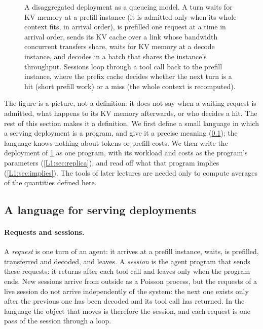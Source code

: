 \begin{figure}[t]
\caption{A disaggregated deployment as a queueing model. A turn waits for KV memory
at a prefill instance (it is admitted only when its whole context fits, in arrival
order), is prefilled one request at a time in arrival order, sends its KV cache over a
link whose bandwidth concurrent transfers share, waits for KV memory at a decode
instance, and decodes in a batch that shares the instance's throughput. Sessions loop
through a tool call back to the prefill instance, where the prefix cache decides
whether the next turn is a hit (short prefill work) or a miss (the whole context is
recomputed).}
\label{fig:deployment}
\end{figure}

The figure is a picture, not a definition: it does not say when a waiting request is
admitted, what happens to its KV memory afterwards, or who decides a hit. The rest of
this section makes it a definition. We first define a small language in which a
serving deployment is a program, and give it a precise meaning
(\cref{L1:sec:language}); the language knows nothing about tokens or prefill costs.
We then write the deployment of \cref{fig:deployment} as one program, with its
workload and costs as the program's parameters (\cref{L1:sec:replica}), and read off
what that program implies (\cref{L1:sec:implies}). The tools of later lectures are
needed only to compute averages of the quantities defined here.

\subsection{A language for serving deployments}\label{L1:sec:language}

\paragraph{Requests and sessions.} A \emph{request} is one turn of an agent: it
arrives at a prefill instance, waits, is prefilled, transferred and decoded, and
leaves. A \emph{session} is the agent program that sends these requests: it returns
after each tool call and leaves only when the program ends. New sessions arrive from
outside as a Poisson process, but the requests of a live session do not arrive
independently of the system: the next one exists only after the previous one has been
decoded and its tool call has returned. In the language the object that moves is
therefore the session, and each request is one pass of the session through a loop.

